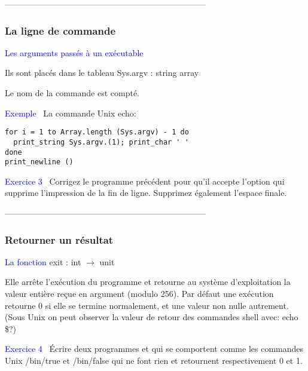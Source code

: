 ------------------------------------------------------------------------
%
\begin{frame}
\frametitle{La ligne de commande}

\textcolor{blue}{Les arguments passés à un exécutable}

Ils sont placés dans le tableau \textsf{Sys.argv : string array}

Le nom de la commande est compté.

\textcolor{blue}{Exemple} \ La commande Unix \textsf{echo}:

\begin{verbatim}
for i = 1 to Array.length (Sys.argv) - 1 do
  print_string Sys.argv.(1); print_char ' '
done
print_newline ()
\end{verbatim}

\textcolor{blue}{Exercice 3} \ Corrigez le programme précédent pour qu'il accepte
l'option  qui supprime l'impression de la fin de
ligne. Supprimez également l'espace finale.

\end{frame}

------------------------------------------------------------------------
%
\begin{frame}
\frametitle{Retourner un résultat}

\textcolor{blue}{La fonction} \textsf{exit : int $\rightarrow$ unit}

Elle arrête l'exécution du programme et retourne au système
d'exploitation la valeur entière reçue en argument (modulo 256). Par
défaut une exécution retourne 0 si elle se termine normalement, et une
valeur non nulle autrement. (Sous Unix on peut observer la valeur de
retour des commandes shell avec: \textsf{echo \$?})

\textcolor{blue}{Exercice 4} \ \'{E}crire deux programmes \Xtrue et
\Xfalse qui se comportent comme les commandes Unix
\textsf{/bin/true} et \textsf{/bin/false} qui ne font rien et
retournent respectivement 0 et 1.

\end{frame}


